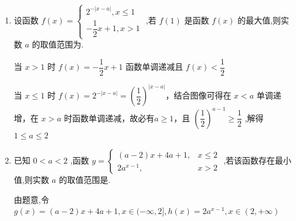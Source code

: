 \begin{enumerate}
\begin{jieda}
        因此,不等式 $f\left( {m - 2}\right)  \geq  f\left( {m + 3}\right)$ 等价于 $\left| {m - 2}\right|  \geq  \left| {m + 3}\right|$ ,
        
        即 ${\left( m - 2\right) }^{2} \geq  {\left( m + 3\right) }^{2}$ ,解得 $m \leq   - \dfrac{1}{2}$ .
        
        故 $m$ 的最大值为 $- \dfrac{1}{2}$
    \end{jieda} 
    
    \item 设函数 $f\left( x\right)  = \left\{  \begin{array}{l} {2}^{-\left| {x - a}\right| },x \leq  1 \\   - \dfrac{1}{2}x + 1,x > 1 \end{array}\right.$ ,若 $f\left( 1\right)$ 是函数 $f\left( x\right)$ 的最大值,则实数 $a$ 的取值范围为.
    \begin{jieda}
        当 $x > 1$ 时 $f\left( x\right)  =  - \dfrac{1}{2}x + 1$ 函数单调递减且 $f\left( x\right)  < \dfrac{1}{2}$
        
        当 $x \leq  1$ 时 $f\left( x\right)  = {2}^{-\left| {x - a}\right| } = {\left( \dfrac{1}{2}\right) }^{\left| x - a\right| }$，结合图像可得在 $x < a$ 单调递增，在 $x > a$ 时函数单调递减，故必有$a \geq 1$，且 ${\left( \dfrac{1}{2}\right) }^{a - 1} \geq  \dfrac{1}{2}$ ,解得 $1 \leq  a \leq  2$       
    \end{jieda}
    \item 已知 $0 < a < 2$ ,函数 $y = \left\{  \begin{matrix} \left( {a - 2}\right) x + {4a} + 1, & x \leq  2 \\  2{a}^{x - 1}, & x > 2 \end{matrix}\right.$ ,若该函数存在最小值,则实数 $a$ 的取值范围是.
    \begin{jieda}
        由题意,令 $g\left( x\right)  = \left( {a - 2}\right) x + {4a} + 1,x \in  ( - \infty ,2\rbrack ,h\left( x\right)  = 2{a}^{x - 1},x \in  \left( {2, + \infty }\right)$

\end{jieda}
\end{enumerate}
